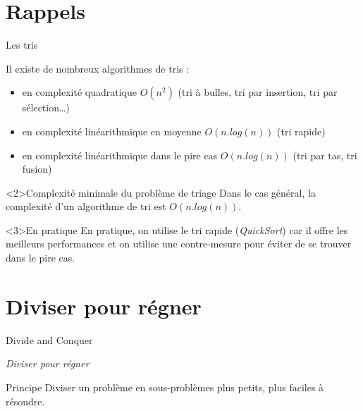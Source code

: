 
\date[14 fév. 2018]{Mercredi 14 février 2018}
\subtitle{Diviser pour régner}
\maketitle

\section{Rappels}

\begin{frame}{Les tris}

Il existe de nombreux algorithmes de tris :
\begin{itemize}
  \item en complexité quadratique $O(n^2)$ (tri à bulles, tri par insertion, tri par sélection\dots)
  \item en complexité linéarithmique en moyenne $O(n.log(n))$ (tri rapide)
  \item en complexité linéarithmique dans le pire cas $O(n.log(n))$ (tri par tas, tri fusion)
\end{itemize}

\begin{block}<2>{Complexité minimale du problème de triage}
Dans le cas général, la complexité d'un algorithme de tri est $O(n.log(n))$.
\end{block}

\begin{exampleblock}<3>{En pratique}
En pratique, on utilise le tri rapide (\textit{QuickSort}) car il offre les meilleurs performances et on utilise une contre-mesure pour éviter de se trouver dans le pire cas.
\end{exampleblock}
\end{frame}

\section{Diviser pour régner}

\begin{frame}{Divide and Conquer}
\begin{center}
\textit{Diviser pour régner} 
\end{center}

\begin{block}{Principe}
Diviser un problème en sous-problèmes plus petits, plus faciles à résoudre.
\end{block}

\end{frame}

